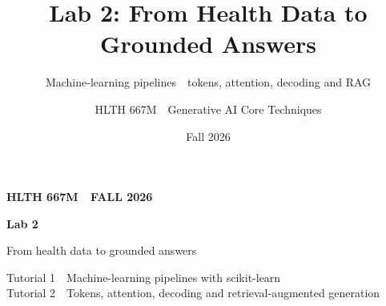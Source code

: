 \documentclass[aspectratio=169,11pt]{beamer}
\title{Lab 2: From Health Data to Grounded Answers}
\subtitle{Machine-learning pipelines \,\textperiodcentered\, tokens, attention, decoding and RAG}
\author{HLTH 667M \,\textperiodcentered\, Generative AI Core Techniques}
\date{Fall 2026}
\begin{document}
{
\begin{frame}
  \vfill
  {\footnotesize\bfseries\color{sky}HLTH 667M \,\textperiodcentered\, FALL 2026}\\[5mm]
  {\fontsize{30}{35}\selectfont\bfseries\color{white}Lab 2\par}\vspace{1.5mm}
  {\fontsize{19}{24}\selectfont\color{white}From health data to grounded answers\par}
  \vspace{6mm}{\color{sky}\rule{14mm}{1.6pt}}\par\vspace{6mm}
  {\color{white!75!navy}Tutorial 1 \,\textperiodcentered\, Machine-learning pipelines with scikit-learn\\[1mm]
   Tutorial 2 \,\textperiodcentered\, Tokens, attention, decoding and retrieval-augmented generation\par}
  \vfill\vfill
\end{frame}}




\end{document}
